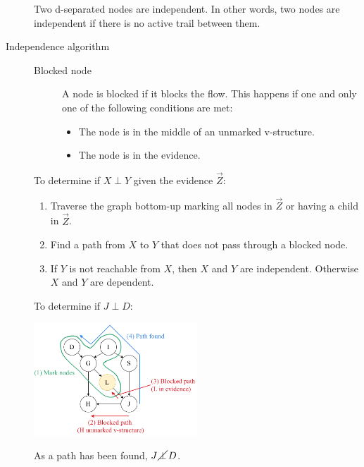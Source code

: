 \begin{description}
        \begin{theorem}
            Two d-separated nodes are independent.
            In other words, two nodes are independent if there is no active trail between them.
        \end{theorem}

    \item[Independence algorithm] \phantom{}
        \begin{description}
            \item[Blocked node]
                A node is blocked if it blocks the flow.
                This happens if one and only one of the following conditions are met:
                \begin{itemize}
                    \item The node is in the middle of an unmarked v-structure.
                    \item The node is in the evidence.
                \end{itemize}
        \end{description}
        To determine if $X \perp Y$ given the evidence $\vec{Z}$:
        \begin{enumerate}
            \item Traverse the graph bottom-up marking all nodes in $\vec{Z}$ or
                having a child in $\vec{Z}$.
            \item Find a path from $X$ to $Y$ that does not pass through a blocked node.
            \item If $Y$ is not reachable from $X$, then $X$ and $Y$ are independent.
                Otherwise $X$ and $Y$ are dependent.
        \end{enumerate}

        \begin{example}
            To determine if $J \perp D$:
            \begin{center}
                \includegraphics[width=0.5\textwidth]{img/_d_sep_example.pdf}
            \end{center}
            As a path has been found, $J \,\cancel{\perp}\, D$.
        \end{example}
    


\end{description}
